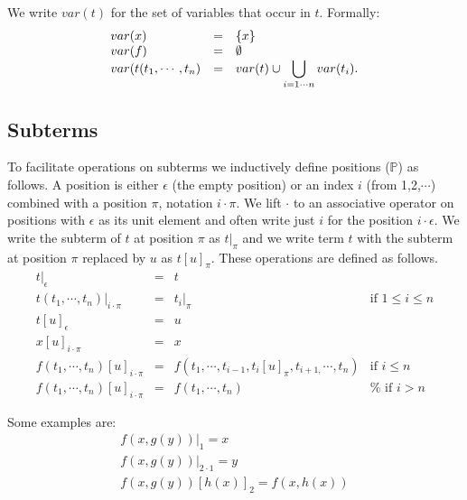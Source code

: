 \documentclass{article}
\begin{document}
We write $var(t)$ for the set of variables that occur in $t$. Formally:%
\begin{equation*}
\begin{array}{lll}
var(x) & = & \{x\} \\ 
var(f) & = & \emptyset \\ 
var(t(t_{1},\cdots ,t_{n}) & = & var(t)\cup \dbigcup\limits_{i=1\cdots
n}var(t_{i}).%
\end{array}%
\end{equation*}

\subsection{Subterms}

To facilitate operations on subterms we inductively define positions ($%
\mathbb{P}$) as follows. A position is either $\epsilon $ (the empty
position) or an index $i$ (from 1,2,$\cdots $) combined with a position $\pi 
$, notation $i\cdot \pi $. We lift $\cdot $ to an associative operator on
positions with $\epsilon $ as its unit element and often write just $i$ for
the position $i\cdot \epsilon $. We write the subterm of $t$ at position $%
\pi $ as $t|_{\pi }$ and we write term $t$ with the subterm at position $\pi 
$ replaced by $u$ as $t[u]_{\pi }$. These operations are defined as follows.%
\begin{equation*}
\begin{array}{llll}
t|_{\epsilon } & = & t &  \\ 
t(t_{1},\cdots ,t_{n})|_{i\cdot \pi } & = & t_{i}|_{\pi } & \text{if }1\leq
i\leq n \\ 
t[u]_{\epsilon } & = & u &  \\ 
x[u]_{i\cdot \pi } & = & x &  \\ 
f(t_{1},\cdots ,t_{n})[u]_{i\cdot \pi } & = & f(t_{1},\cdots
,t_{i-1},t_{i}[u]_{\pi },t_{i+1,}\cdots ,t_{n}) & \text{if }i\leq n \\ 
f(t_{1},\cdots ,t_{n})[u]_{i\cdot \pi } & = & f(t_{1},\cdots ,t_{n}) & \text{%
if }i>n%
\end{array}%
\end{equation*}

Some examples are:%
\begin{equation*}
\begin{array}{l}
f(x,g(y))|_{1}=x \\ 
f(x,g(y))|_{2\cdot 1}=y \\ 
f(x,g(y))[h(x)]_{2}=f(x,h(x))%
\end{array}%
\end{equation*}
\end{document}

